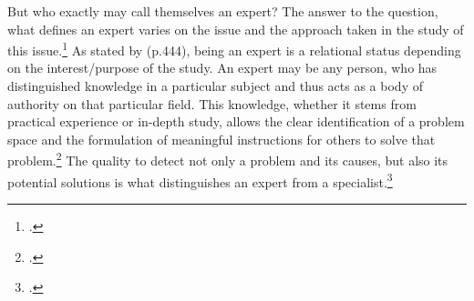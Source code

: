 But who exactly may call themselves an expert? The answer to the question, what defines an expert varies on the issue and the approach taken in the study of this issue.\footcite[Cf.][p.179]{Flickintroductionqualitativeresearch2009} As stated by \cite{MeuserExpertInneninterviewsvielfacherprobt1991} (p.444), being an expert is a relational status depending on the interest/purpose of the study. An expert may be any person, who has distinguished knowledge in a particular subject and thus acts as a body of authority on that particular field. This knowledge, whether it stems from practical experience or in-depth study, allows the clear identification of a problem space and the formulation of meaningful instructions for others to solve that problem.\footcites[Cf.][p.469]{MeuserExpertInneninterviewsvielfacherprobt1991}[cf.][p.467]{MeuserExperteninterviewkonzeptionelleGrundlagen2009}[cf.][p.179]{Flickintroductionqualitativeresearch2009}[cf.][p.451]{PfadenhauerExperteninterviewGesprachauf2007}[cf.][p.19]{BognerInterviewsmitExperten2014} The quality to detect not only a problem and its causes, but also its potential solutions is what distinguishes an expert from a specialist.\footcite[Cf.][p.424]{BuberQualitativeMarktforschungKonzepte2007}  


